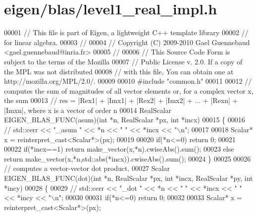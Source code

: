 \hypertarget{eigen_2blas_2level1__real__impl_8h_source}{}\section{eigen/blas/level1\+\_\+real\+\_\+impl.h}
\label{eigen_2blas_2level1__real__impl_8h_source}

\begin{DoxyCode}
00001 \textcolor{comment}{// This file is part of Eigen, a lightweight C++ template library}
00002 \textcolor{comment}{// for linear algebra.}
00003 \textcolor{comment}{//}
00004 \textcolor{comment}{// Copyright (C) 2009-2010 Gael Guennebaud <gael.guennebaud@inria.fr>}
00005 \textcolor{comment}{//}
00006 \textcolor{comment}{// This Source Code Form is subject to the terms of the Mozilla}
00007 \textcolor{comment}{// Public License v. 2.0. If a copy of the MPL was not distributed}
00008 \textcolor{comment}{// with this file, You can obtain one at http://mozilla.org/MPL/2.0/.}
00009 
00010 \textcolor{preprocessor}{#include "common.h"}
00011 
00012 \textcolor{comment}{// computes the sum of magnitudes of all vector elements or, for a complex vector x, the sum}
00013 \textcolor{comment}{// res = |Rex1| + |Imx1| + |Rex2| + |Imx2| + ... + |Rexn| + |Imxn|, where x is a vector of order n}
00014 RealScalar EIGEN\_BLAS\_FUNC(asum)(\textcolor{keywordtype}{int} *n, RealScalar *px, \textcolor{keywordtype}{int} *incx)
00015 \{
00016 \textcolor{comment}{//   std::cerr << "\_asum " << *n << " " << *incx << "\(\backslash\)n";}
00017 
00018   Scalar* x = \textcolor{keyword}{reinterpret\_cast<}Scalar*\textcolor{keyword}{>}(px);
00019 
00020   \textcolor{keywordflow}{if}(*n<=0) \textcolor{keywordflow}{return} 0;
00021 
00022   \textcolor{keywordflow}{if}(*incx==1)  \textcolor{keywordflow}{return} make\_vector(x,*n).cwiseAbs().sum();
00023   \textcolor{keywordflow}{else}          \textcolor{keywordflow}{return} make\_vector(x,*n,std::abs(*incx)).cwiseAbs().sum();
00024 \}
00025 
00026 \textcolor{comment}{// computes a vector-vector dot product.}
00027 Scalar EIGEN\_BLAS\_FUNC(dot)(\textcolor{keywordtype}{int} *n, RealScalar *px, \textcolor{keywordtype}{int} *incx, RealScalar *py, \textcolor{keywordtype}{int} *incy)
00028 \{
00029 \textcolor{comment}{//   std::cerr << "\_dot " << *n << " " << *incx << " " << *incy << "\(\backslash\)n";}
00030 
00031   \textcolor{keywordflow}{if}(*n<=0) \textcolor{keywordflow}{return} 0;
00032 
00033   Scalar* x = \textcolor{keyword}{reinterpret\_cast<}Scalar*\textcolor{keyword}{>}(px);

\end{DoxyCode}

